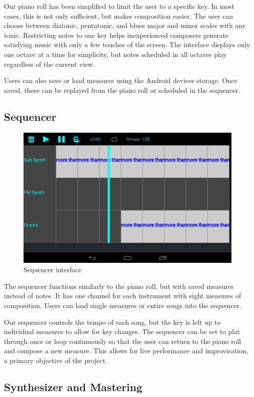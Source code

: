 \documentclass[letterpaper,12pt]{article}
\begin{document}
Our piano roll has been simplified to limit the user to a specific key. In most cases, this is not only sufficient, but makes composition easier. The user can choose between diatonic, pentatonic, and blues major and minor scales with any tonic. Restricting notes to one key helps inexperienced composers generate satisfying music with only a few touches of the screen. The interface displays only one octave at a time for simplicity, but notes scheduled in all octaves play regardless of the current view.

Users can also save or load measures using the Android devices storage. Once saved, these can be replayed from the piano roll or scheduled in the sequencer.

\subsection{Sequencer}

\begin{figure}
\centering
\includegraphics[width=.6\textwidth]{figures/sequencer.png}
\caption{Sequencer interface}
\label{fig:sequencer}
\end{figure}

The sequencer functions similarly to the piano roll, but with saved measures instead of notes. It has one channel for each instrument with eight measures of composition. Users can load single measures or entire songs into the sequencer.

Our sequencer controls the tempo of each song, but the key is left up to individual measures to allow for key changes. The sequencer can be set to plat through once or loop continuously so that the user can return to the piano roll and compose a new measure. This allows for live performance and improvisation, a primary objective of the project.

\subsection{Synthesizer and Mastering}
\end{document}
